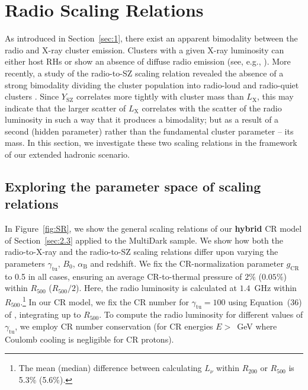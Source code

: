 \documentclass[traditabstract]{aa}
\def\C#1{{\bf #1}}
\newcommand{\rmn}{\mathrm}
\begin{document}
\section{Radio Scaling Relations}
\label{sec:4}
As introduced in Section~\ref{sec:1}, there exist an apparent bimodality between
the radio and X-ray cluster emission. Clusters with a given X-ray luminosity can
either host RHs or show an absence of diffuse radio emission
(see, e.g., \citealp{2009A&A...507..661B,2011A&A...527A..99E}). More recently, a study
of the radio-to-SZ scaling relation revealed the absence of a strong bimodality
dividing the cluster population into radio-loud and radio-quiet clusters
\citep{2012MNRAS.421L.112B}. Since $Y_{\rmn{SZ}}$ correlates more tightly with
cluster mass than $L_{\rmn{X}}$, this may indicate that the larger scatter
of $L_{\rmn{X}}$ correlates with the scatter of the radio luminosity in such a way that
it produces a bimodality; but as a result of a second (hidden parameter) rather
than the fundamental cluster parameter -- its mass. In this section, we
investigate these two scaling relations in the framework of our extended
hadronic scenario.


\subsection{Exploring the parameter space of scaling relations}

In Figure~\ref{fig:SR}, we show the general scaling relations of our \C{hybrid} CR
model of Section~\ref{sec:2.3} applied to the MultiDark sample. We show how both
the radio-to-X-ray and the radio-to-SZ scaling relations differ upon varying the
parameters $\gamma_{\rmn{tu}}$, $B_{0}$, $\alpha_{\rmn{B}}$ and redshift. We fix
the CR-normalization parameter $g_{\rmn{CR}}$ to 0.5 in all cases, ensuring an
average CR-to-thermal pressure of $2\%$ ($0.05\%$) within $R_{500}$
($R_{500}/2$). Here, the radio luminosity is calculated at $1.4$~GHz within
$R_{500}.$\footnote{The mean (median) difference between calculating $L_{\nu}$
  within $R_{200}$ or $R_{500}$ is 5.3\% (5.6\%).}  In our CR model, we fix the
CR number for $\gamma_{\rmn{tu}}=100$ using Equation~(36) of
\cite{2011A&A...527A..99E}, integrating up to $R_{500}$. To compute the radio
luminosity for different values of $\gamma_{\rmn{tu}}$, we employ CR number
conservation (for CR energies $E>$~GeV where Coulomb cooling is negligible for CR
protons).
\end{document}
